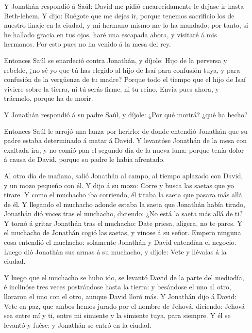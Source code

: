  Y Jonathán respondió á Saúl: David me pidió
encarecidamente le dejase ir hasta Beth-lehem.  Y dijo:
Ruégote que me dejes ir, porque tenemos sacrificio los de nuestro linaje
en la ciudad, y mi hermano mismo me lo ha mandado; por tanto, si he
hallado gracia en tus ojos, haré una escapada ahora, y visitaré á mis
hermanos. Por esto pues no ha venido á la mesa del rey.

 Entonces Saúl se enardeció contra Jonathán, y díjole: Hijo
de la perversa y rebelde, ¿no sé yo que tú has elegido al hijo de Isaí
para confusión tuya, y para confusión de la vergüenza de tu madre?
 Porque todo el tiempo que el hijo de Isaí viviere sobre la
tierra, ni tú serás firme, ni tu reino. Envía pues ahora, y tráemelo,
porque ha de morir.

 Y Jonathán respondió á su padre Saúl, y díjole: ¿Por qué
morirá? ¿qué ha hecho?

 Entonces Saúl le arrojó una lanza por herirlo: de donde
entendió Jonathán que su padre estaba determinado á matar á David.
 Y levantóse Jonathán de la mesa con exaltada ira, y no
comió pan el segundo día de la nueva luna: porque tenía dolor á causa de
David, porque su padre le había afrentado.

 Al otro día de mañana, salió Jonathán al campo, al tiempo
aplazado con David, y un mozo pequeño con él.  Y dijo á su
mozo: Corre y busca las saetas que yo tirare. Y como el muchacho iba
corriendo, él tiraba la saeta que pasara más allá de él.  Y
llegando el muchacho adonde estaba la saeta que Jonathán había tirado,
Jonathán dió voces tras el muchacho, diciendo: ¿No está la saeta más
allá de ti?  Y tornó á gritar Jonathán tras el muchacho:
Date priesa, aligera, no te pares. Y el muchacho de Jonathán cogió las
saetas, y vínose á su señor.  Empero ninguna cosa entendió
el muchacho: solamente Jonathán y David entendían el negocio.
 Luego dió Jonathán sus armas á su muchacho, y díjole: Vete
y llévalas á la ciudad.

 Y luego que el muchacho se hubo ido, se levantó David de
la parte del mediodía, é inclinóse tres veces postrándose hasta la
tierra: y besándose el uno al otro, lloraron el uno con el otro, aunque
David lloró más.  Y Jonathán dijo á David: Vete en paz, que
ambos hemos jurado por el nombre de Jehová, diciendo: Jehová sea entre
mí y ti, entre mi simiente y la simiente tuya, para siempre. Y él se
levantó y fuése: y Jonathán se entró en la ciudad.


